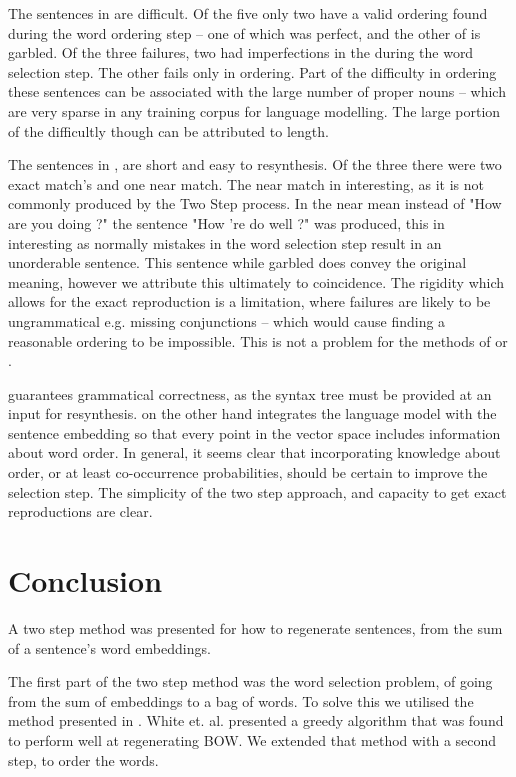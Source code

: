 \documentclass[11pt]{article}
\theoremstyle{plain}
\theoremstyle{definition}
\begin{document}
The sentences in  are difficult. Of the five only two have a valid ordering found during the word ordering step -- one of which was perfect, and the other of is garbled. Of the three failures, two had imperfections in the during the word selection step. The other fails only in ordering. Part of the difficulty in ordering these sentences can be associated with the large number of proper nouns -- which are very sparse in any training corpus for language modelling. The large portion of the difficultly though can be attributed to length.

The sentences in , are short and easy to resynthesis. Of the three there were two exact match's and one near match. The near match in interesting, as it is not commonly produced by the Two Step process. In the near mean instead of "How are you doing ?" the sentence "How 're do well ?" was produced, this in interesting as normally mistakes in the word selection step result in an unorderable sentence. This sentence while garbled does convey the original meaning, however we attribute this ultimately to coincidence. The rigidity which allows for the exact reproduction is a limitation, where failures are likely to be ungrammatical e.g. missing conjunctions -- which would cause finding a reasonable ordering to be impossible. This is not a problem for the methods of  \textcite{iyyer2014generating} or \textcite{Bowman2015SmoothGeneration}.

\textcite{iyyer2014generating} guarantees grammatical correctness, as the syntax tree must be provided at an input for resynthesis. \textcite{Bowman2015SmoothGeneration} on the other hand integrates the language model with the sentence embedding so that every point in the vector space includes information about word order. In general, it seems clear that incorporating knowledge about order, or at least co-occurrence probabilities, should be certain to improve the selection step. The simplicity of the two step approach, and capacity to get exact reproductions are clear.



\section{Conclusion} \label{conclusion}
A two step method was presented for how to regenerate sentences, from the sum of a sentence's word embeddings. 

The first part of the two step method was the word selection problem, of going from the sum of embeddings to a bag of words. To solve this we utilised the method presented in \textcite{White2015BOWgen}. White et. al. presented a greedy algorithm that was found to perform well at regenerating BOW. We extended that method with a second step, to order the words.
\end{document}
